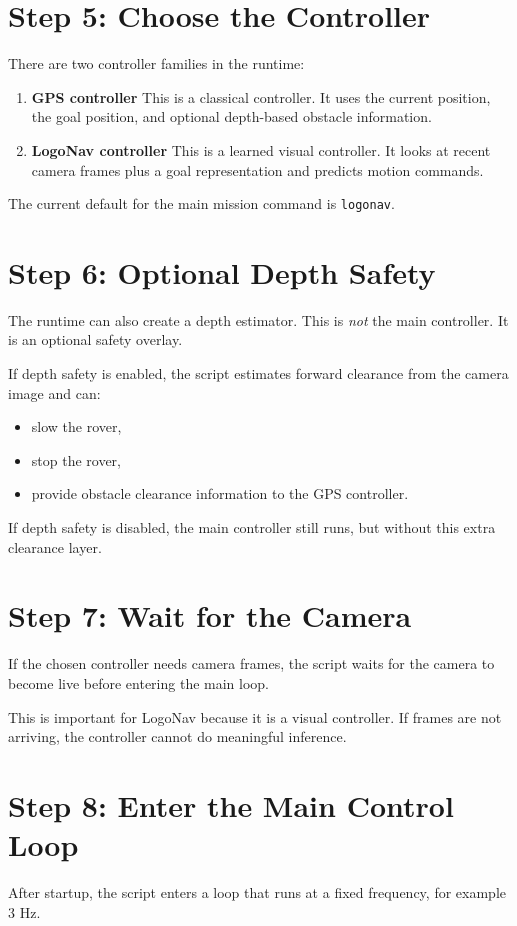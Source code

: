 \documentclass[11pt]{article}
\begin{document}
\section*{Step 5: Choose the Controller}
There are two controller families in the runtime:
\begin{enumerate}[leftmargin=*]
\item \textbf{GPS controller}
This is a classical controller.
It uses the current position, the goal position, and optional depth-based obstacle information.

\item \textbf{LogoNav controller}
This is a learned visual controller.
It looks at recent camera frames plus a goal representation and predicts motion commands.
\end{enumerate}

The current default for the main mission command is \texttt{logonav}.

\section*{Step 6: Optional Depth Safety}
The runtime can also create a depth estimator.
This is \emph{not} the main controller.
It is an optional safety overlay.

If depth safety is enabled, the script estimates forward clearance from the camera image and can:
\begin{itemize}[leftmargin=*]
\item slow the rover,
\item stop the rover,
\item provide obstacle clearance information to the GPS controller.
\end{itemize}

If depth safety is disabled, the main controller still runs, but without this extra clearance layer.

\section*{Step 7: Wait for the Camera}
If the chosen controller needs camera frames, the script waits for the camera to become live before entering the main loop.

This is important for LogoNav because it is a visual controller.
If frames are not arriving, the controller cannot do meaningful inference.

\section*{Step 8: Enter the Main Control Loop}
After startup, the script enters a loop that runs at a fixed frequency, for example 3 Hz.
\end{document}
